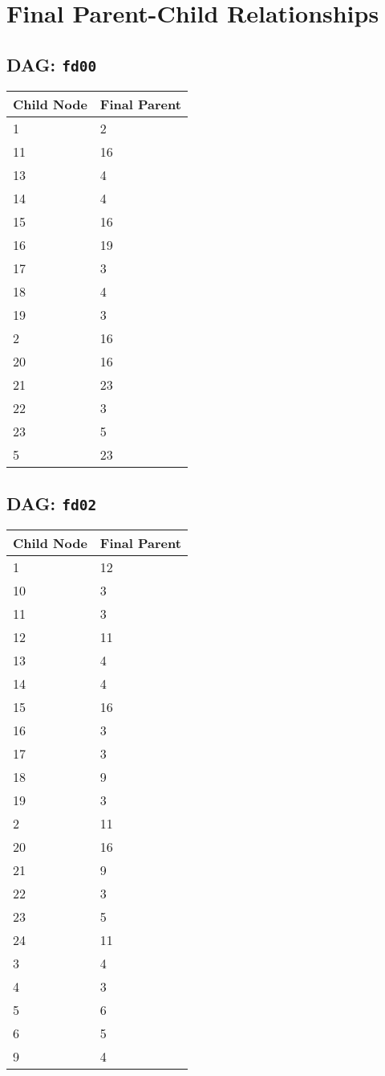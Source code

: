 \documentclass{article}
\begin{document}
\pagestyle{fancy}
\fancyhf{}
\section*{Final Parent-Child Relationships}
\subsection*{DAG: \texttt{fd00}}
\begin{tabular}{ll}
\toprule
\textbf{Child Node} & \textbf{Final Parent} \\
\midrule
1 & 2 \\
11 & 16 \\
13 & 4 \\
14 & 4 \\
15 & 16 \\
16 & 19 \\
17 & 3 \\
18 & 4 \\
19 & 3 \\
2 & 16 \\
20 & 16 \\
21 & 23 \\
22 & 3 \\
23 & 5 \\
5 & 23 \\
\bottomrule
\end{tabular}

\subsection*{DAG: \texttt{fd02}}
\begin{tabular}{ll}
\toprule
\textbf{Child Node} & \textbf{Final Parent} \\
\midrule
1 & 12 \\
10 & 3 \\
11 & 3 \\
12 & 11 \\
13 & 4 \\
14 & 4 \\
15 & 16 \\
16 & 3 \\
17 & 3 \\
18 & 9 \\
19 & 3 \\
2 & 11 \\
20 & 16 \\
21 & 9 \\
22 & 3 \\
23 & 5 \\
24 & 11 \\
3 & 4 \\
4 & 3 \\
5 & 6 \\
6 & 5 \\
9 & 4 \\
\bottomrule
\end{tabular}
\end{document}

